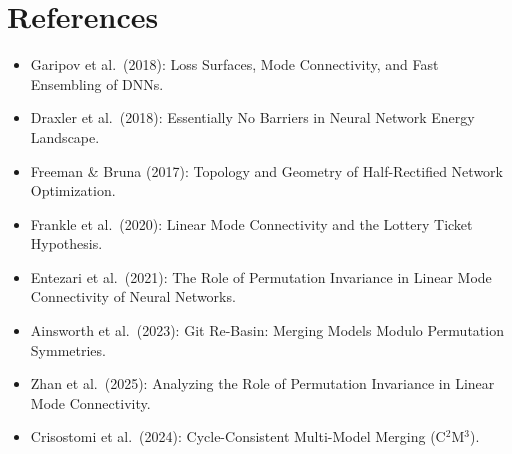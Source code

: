 \documentclass[11pt,a4paper]{article}
\begin{document}
\section{References}

\begin{itemize}
    \item Garipov et al.\ (2018): Loss Surfaces, Mode Connectivity, and Fast Ensembling of DNNs.
    \item Draxler et al.\ (2018): Essentially No Barriers in Neural Network Energy Landscape.
    \item Freeman \& Bruna (2017): Topology and Geometry of Half-Rectified Network Optimization.
    \item Frankle et al.\ (2020): Linear Mode Connectivity and the Lottery Ticket Hypothesis.
    \item Entezari et al.\ (2021): The Role of Permutation Invariance in Linear Mode Connectivity of Neural Networks.
    \item Ainsworth et al.\ (2023): Git Re-Basin: Merging Models Modulo Permutation Symmetries.
    \item Zhan et al.\ (2025): Analyzing the Role of Permutation Invariance in Linear Mode Connectivity.
    \item Crisostomi et al.\ (2024): Cycle-Consistent Multi-Model Merging (C$^2$M$^3$).
\end{itemize}
\end{document}
